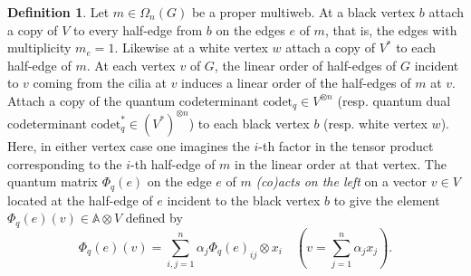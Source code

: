 \documentclass[12pt, reqno]{amsart}
\theoremstyle{definition}
\newtheorem{defi}[theo]{Definition}
\begin{document}
\begin{defi}
Let $m\in\Omega_n(G)$ be a proper multiweb.  At a black vertex $b$ attach a copy of $V$ to every half-edge from $b$ on the edges $e$ of $m$, that is, the edges with multiplicity $m_e=1$. Likewise at a white vertex $w$ attach a copy of $V^*$ to each half-edge of $m$.  At each vertex $v$ of $G$, the linear order of half-edges of $G$ incident to $v$ coming from the cilia at $v$ induces a linear order of the half-edges of $m$ at $v$.  Attach a copy of the quantum codeterminant $\mathrm{codet}_q\in V^{\otimes n}$ (resp. quantum dual codeterminant $\mathrm{codet}_q^*\in(V^*)^{\otimes n}$) to each black vertex $b$ (resp. white vertex $w$).  Here, in either vertex case one imagines the $i$-th factor in the tensor product corresponding to the $i$-th half-edge of $m$ in the linear order at that vertex.  The quantum matrix $\Phi_q(e)$ on the edge $e$ of $m$ \emph{(co)acts on the left} on a vector $v\in V$ located at the half-edge of $e$ incident to the black vertex $b$ to give the element $\Phi_q(e)(v)\in\mathbb{A}\otimes V$ defined by
$$
\Phi_q(e)(v)=\sum_{i,j=1}^n \alpha_j \Phi_q(e)_{ij} \otimes x_i \quad \left(v=\sum_{j=1}^n \alpha_j x_j\right).
$$  

\end{defi}
\end{document}
